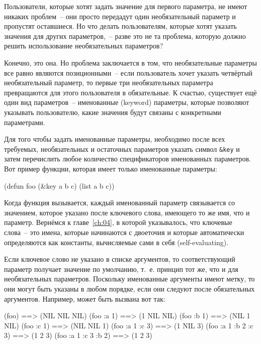 Пользователи, которые хотят задать значение для первого параметра, не имеют никаких
проблем~-- они просто передадут один необязательный параметр и пропустят оставшиеся.  Но
что делать пользователям, которые хотят указать значения для других параметров,~-- разве
это не та проблема, которую должно решить использование необязательных параметров?

Конечно, это она.  Но проблема заключается в том, что необязательные параметры все равно
являются позиционными~-- если пользователь хочет указать четвёртый необязательный
параметр, то первые три необязательных параметра превращаются для этого пользователя в
обязательные.  К счастью, существует ещё один вид параметров~-- именованные (keyword)
параметры, которые позволяют указывать пользователю, какие значения будут связаны с
конкретными параметрами.

Для того чтобы задать именованные параметры, необходимо после всех требуемых,
необязательных и остаточных параметров указать символ \lstinline!&key! и затем
перечислить любое количество спецификаторов именованных параметров.  Вот пример функции,
которая имеет только именованные параметры:

\begin{myverb}
  (defun foo (&key a b c) 
    (list a b c))
\end{myverb}

Когда функция вызывается, каждый именованный параметр связывается со значением, которое
указано после ключевого слова, имеющего то же имя, что и параметр.  Вернёмся к
главе~\ref{ch:04}, в которой указывалось, что ключевые слова~-- это имена, которые
начинаются с двоеточия и которые автоматически определяются как константы, вычисляемые
сами в себя (self-evaluating).

Если ключевое слово не указано в списке аргументов, то соответствующий параметр получает
значение по умолчанию, т.~е. принцип тот же, что и для необязательных параметров.
Поскольку именованные аргументы имеют метку, то они могут быть указаны в любом порядке,
если они следуют после обязательных аргументов.  Например,  может быть вызвана
вот так:

\begin{myverb}
  (foo)                ==> (NIL NIL NIL)
  (foo :a 1)           ==> (1 NIL NIL)
  (foo :b 1)           ==> (NIL 1 NIL)
  (foo :c 1)           ==> (NIL NIL 1)
  (foo :a 1 :c 3)      ==> (1 NIL 3)
  (foo :a 1 :b 2 :c 3) ==> (1 2 3)
  (foo :a 1 :c 3 :b 2) ==> (1 2 3)
\end{myverb}

